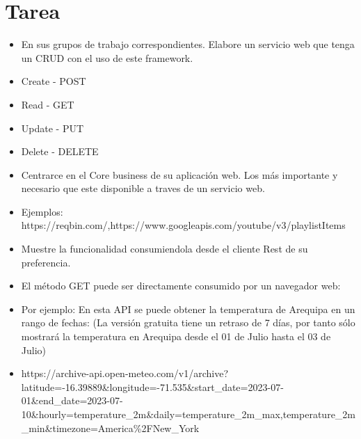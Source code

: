\documentclass{article}
\begin{document}
    
    \section{Tarea}
    \begin{itemize}
        \item En sus grupos de trabajo correspondientes. Elabore un servicio web que tenga un CRUD con el uso de este framework.
        \item Create - POST
        \item Read - GET
        \item Update - PUT
        \item Delete - DELETE
        \item Centrarce en el Core business de su aplicación web. Los más importante y necesario que este disponible a traves de un servicio web.
        \item Ejemplos: https://reqbin.com/,https://www.googleapis.com/youtube/v3/playlistItems
        \item Muestre la funcionalidad consumiendola desde el cliente Rest de su preferencia.
        \item El método GET puede ser directamente consumido por un navegador web:
        \item Por ejemplo: En esta API se puede obtener la temperatura de Arequipa en un rango de fechas: (La versión gratuita tiene un retraso de 7 días, por tanto sólo mostrará la temperatura en Arequipa desde el 01 de Julio hasta el 03 de Julio)
        \item https://archive-api.open-meteo.com/v1/archive?latitude=-16.39889\&longitude=-71.535\&start\_date=2023-07-01\&end\_date=2023-07-10\&hourly=temperature\_2m\&daily=temperature\_2m\_max,temperature\_2m\_min\&timezone=America\%2FNew\_York
    \end{itemize}
\end{document}
